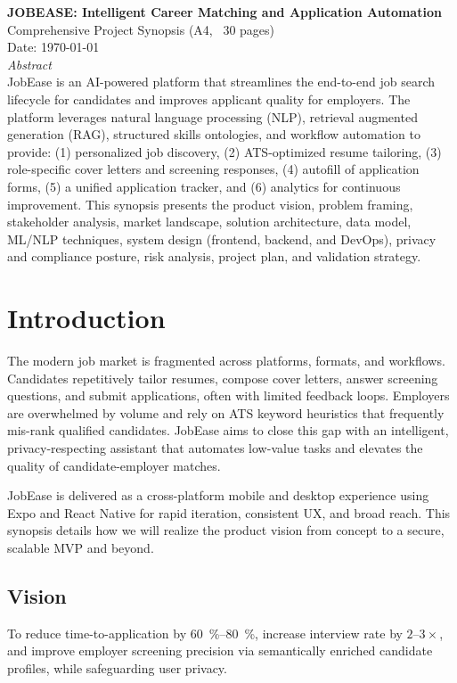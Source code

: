 \documentclass[12pt,a4paper]{article}
\begin{document}
\begin{titlepage}
  \centering
  {\Large\bfseries JOBEASE: Intelligent Career Matching and Application Automation\\[0.6em]}
  {\large Comprehensive Project Synopsis (A4, ~30 pages)}\\[2em]
  {\large Date: \today}\\[8em]
  \vfill
  \textit{Abstract}\\[0.8em]
  JobEase is an AI-powered platform that streamlines the end-to-end job search lifecycle for candidates and improves applicant quality for employers. The platform leverages natural language processing (NLP), retrieval augmented generation (RAG), structured skills ontologies, and workflow automation to provide: (1) personalized job discovery, (2) ATS-optimized resume tailoring, (3) role-specific cover letters and screening responses, (4) autofill of application forms, (5) a unified application tracker, and (6) analytics for continuous improvement. This synopsis presents the product vision, problem framing, stakeholder analysis, market landscape, solution architecture, data model, ML/NLP techniques, system design (frontend, backend, and DevOps), privacy and compliance posture, risk analysis, project plan, and validation strategy.
  \vfill
\end{titlepage}

\tableofcontents
\newpage

\section{Introduction}
The modern job market is fragmented across platforms, formats, and workflows. Candidates repetitively tailor resumes, compose cover letters, answer screening questions, and submit applications, often with limited feedback loops. Employers are overwhelmed by volume and rely on ATS keyword heuristics that frequently mis-rank qualified candidates. JobEase aims to close this gap with an intelligent, privacy-respecting assistant that automates low-value tasks and elevates the quality of candidate-employer matches.

JobEase is delivered as a cross-platform mobile and desktop experience using Expo and React Native for rapid iteration, consistent UX, and broad reach. This synopsis details how we will realize the product vision from concept to a secure, scalable MVP and beyond.

\subsection{Vision}
To reduce time-to-application by \SI{60}{\percent}--\SI{80}{\percent}, increase interview rate by \(2\text{--}3\times\), and improve employer screening precision via semantically enriched candidate profiles, while safeguarding user privacy.
\end{document}
